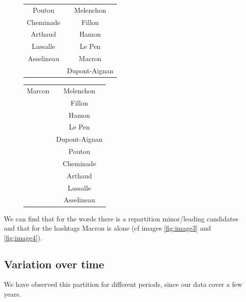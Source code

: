\documentclass[a4paper]{article}
\theoremstyle{definition}
\begin{document}
\begin{figure}
\begin{center}
\begin{multicols}{2}
\begin{tabular}{ | c | c |}
\hline
Poutou & Melenchon\\
Cheminade & Fillon\\
Arthaud & Hamon\\
Lassalle & Le Pen\\
Asselineau & Macron\\
& Dupont-Aignan\\
\hline
\end{tabular}
\bigskip

\begin{tabular}{ | c | c |}
\hline
Marcon & Melenchon\\
& Fillon\\
& Hamon\\
& Le Pen\\
& Dupont-Aignan\\
& Poutou\\
& Cheminade\\
& Arthaud \\
& Lassalle \\
& Asselineau \\
\hline
\end{tabular}
\bigskip
{}
\end{multicols}
\end{center}
\end{figure}

We can find that for the words there is a repartition minor/leading candidates and that for the hashtags Macron is alone (cf images \ref{fig:image3} and \ref{fig:image4}).

\newpage
\subsection{Variation over time}
We have observed this partition for different periods, since our data cover a few years.
\end{document}
